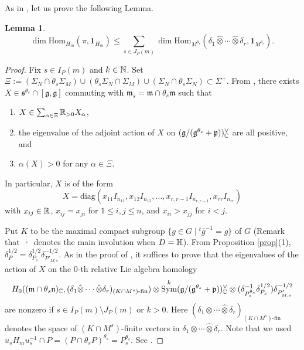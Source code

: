 \documentclass[11pt,letterpaper]{amsart}
\newcommand{\Hom}{\mathrm{Hom}}
\newcommand{\triv}{{\mathbf{1}}}
\renewcommand{\a}{\alpha}
\DeclareMathOperator{\Sym}{Sym}
\newcommand{\fg}{\mathfrak{g}}
\newcommand{\fm}{\mathfrak{m}}
\newcommand{\fn}{\mathfrak{n}}
\newcommand{\fp}{\mathfrak{p}}
\newcommand{\fs}{\mathfrak{s}}
\def\d{\delta}
\def\diag{\mathrm{diag}}
\theoremstyle{plain}
\newtheorem{lem}[thm]{Lemma}  \newtheorem{prop}[thm]{Proposition}
\numberwithin{equation}{section}
\begin{document}
As in \cite[Theorem 5.8]{ST}, let us prove the following Lemma.
\begin{lem}\label{lem}
    \[
    \dim\Hom_{H_m}(\pi,\triv_{H_m})\le \sum_{s\in J_P(m)}\dim\Hom_{M^{\theta_s}}(\delta_1\hat{\otimes}\cdots\hat{\otimes}\delta_r,\triv_{M^{\theta_s}}).
    \]
\end{lem}
\begin{proof}
Fix $s\in I_P(m)$ and $k\in{\mathbb {N}}$. 
Set $\Xi:=(\Sigma_N\cap\theta_s\Sigma_{M})\cup(\theta_s\Sigma_N\cap\Sigma_{M})\cup(\Sigma_N\cap\theta_s\Sigma_N)\subset \Sigma^+$. 
From \cite[Lemma 4.4]{ST}, there exists $X\in \fs^{\theta_s}\cap [\fg,\fg]$ 
commuting with $\fm_s=\fm\cap\theta_s\fm$ such that
\begin{enumerate}
\item\label{i} $X\in\sum_{\a\in\Xi}\BR_{>0}X_{\a}$, 
\item\label{ii} the eigenvalue of the adjoint action of $X$ on $(\fg/(\fg^{\theta_s}+\fp))_{\BC}^{\vee}$ are all positive, and
\item\label{iii} $\a(X)>0$ for any $\a\in\Xi$.
\end{enumerate}
In particular, $X$ is of the form 
    \[
    X=\diag(x_{11}I_{n_{11}},x_{12}I_{n_{12}},\ldots,x_{r,r-1}I_{n_{r,r-1}},x_{rr}I_{n_{rr}})
    \]
with $x_{ij}\in{\mathbb {R}}$, $x_{ij}=x_{ji}$ for $1\le i,j\le n$, and $x_{ii}> x_{jj}$ for $i<j$.

Put $K$ to be the maximal compact subgroup $\{g\in G\mid {}^t\overline{g}^{-1}=g\}$ of $G$ (Remark that $\overline{\ \cdot\ }$ denotes the main involution when $D={\mathbb {H}}$). 
From Proposition \ref{prop}(1), $\d_P^{1/2}=\d_{P_s}^{1/2}\d_{P'_{M,  s}}^{-1/2}$. 
As in the proof of \cite[Theorem 5.8]{ST}, it suffices to prove that 
the eigenvalues of the action of $X$ on the $0$-th relative Lie algebra homology
    \begin{align}\label{zero}
    H_0((\fm\cap\theta_s\fn)_{\BC},(\delta_1\hat{\otimes}\cdots\hat{\otimes}\delta_r)_{(K\cap M^s)\text{-fin}})
    \otimes\Sym^k(\fg/(\fg^{\theta_s}+\fp))^{\vee}_{\BC}\otimes(\d_{P_s^{\theta_s}}^{-1}\d_{P_s}^{1/2})\d_{P'_{M,  s}}^{-1/2}
    \end{align}
are nonzero if $s\in I_P(m)\setminus J_P(m)$ or $k>0$.  
Here $(\delta_1\hat{\otimes}\cdots\hat{\otimes}\delta_r)_{(K\cap M^s)\text{-fin}}$ denotes the space of $(K\cap M^s)$-finite vectors in $\delta_1\hat{\otimes}\cdots\hat{\otimes}\delta_r$.
Note that we used $u_sH_mu_s^{-1}\cap P=(P\cap\theta_sP)^{\theta_s}=P_s^{\theta_s}$.
See \cite[Remark 5.1]{ST}.



\end{proof}
\end{document}
